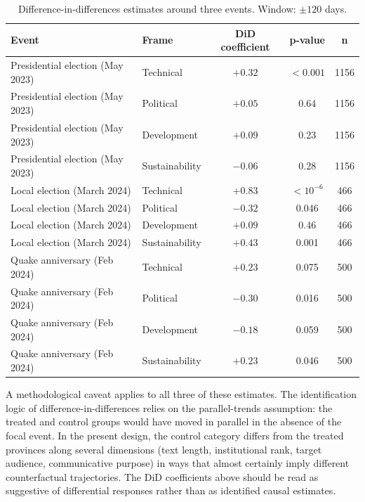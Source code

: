 \documentclass[12pt, journal]{IEEEtran}
\begin{document}
\begin{table}[!ht]
\renewcommand{\arraystretch}{1.3}
\caption{Difference-in-differences estimates around three events. Window: $\pm 120$ days.}
\label{table_did}
\centering
\begin{tabular}{|l|l|c|c|c|}
\hline
\textbf{Event} & \textbf{Frame} & \textbf{DiD coefficient} & \textbf{p-value} & \textbf{n} \\
\hline\hline
Presidential election (May 2023) & Technical & $+0.32$ & $< 0.001$ & 1156 \\
\hline
Presidential election (May 2023) & Political & $+0.05$ & 0.64 & 1156 \\
\hline
Presidential election (May 2023) & Development & $+0.09$ & 0.23 & 1156 \\
\hline
Presidential election (May 2023) & Sustainability & $-0.06$ & 0.28 & 1156 \\
\hline
Local election (March 2024) & Technical & $+0.83$ & $< 10^{-6}$ & 466 \\
\hline
Local election (March 2024) & Political & $-0.32$ & 0.046 & 466 \\
\hline
Local election (March 2024) & Development & $+0.09$ & 0.46 & 466 \\
\hline
Local election (March 2024) & Sustainability & $+0.43$ & 0.001 & 466 \\
\hline
Quake anniversary (Feb 2024) & Technical & $+0.23$ & 0.075 & 500 \\
\hline
Quake anniversary (Feb 2024) & Political & $-0.30$ & 0.016 & 500 \\
\hline
Quake anniversary (Feb 2024) & Development & $-0.18$ & 0.059 & 500 \\
\hline
Quake anniversary (Feb 2024) & Sustainability & $+0.23$ & 0.046 & 500 \\
\hline
\end{tabular}
\end{table}

A methodological caveat applies to all three of these estimates. The identification logic of difference-in-differences relies on the parallel-trends assumption: the treated and control groups would have moved in parallel in the absence of the focal event. In the present design, the control category differs from the treated provinces along several dimensions (text length, institutional rank, target audience, communicative purpose) in ways that almost certainly imply different counterfactual trajectories. The DiD coefficients above should be read as suggestive of differential responses rather than as identified causal estimates.
\end{document}
